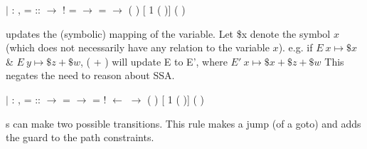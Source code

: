 \documentclass[12pt]{report}
\begin{document}
       
\begin{coqdoccode}
\coqdocindent{3.00em}
\ensuremath{|}  : \coqdockw{\ensuremath{\forall}}          ,\coqdoceol
\coqdocindent{5.00em}
 =   ::  \ensuremath{\rightarrow}\coqdoceol
\coqdocindent{5.00em}
 !  =   \ensuremath{\rightarrow}\coqdoceol
\coqdocindent{5.00em}
 =    \ensuremath{\rightarrow}\coqdoceol
\coqdocindent{5.00em}
 \coqdoceol
\coqdocindent{6.00em}
(        ) [ 1 ( )]\coqdoceol
\coqdocindent{6.00em}
(      )\coqdoceol
\coqdocnoindent
\coqdoceol
\coqdocindent{3.00em}
\end{coqdoccode}
 updates the (symbolic) mapping of the variable.
          Let \$x denote the symbol $x$ (which does not necessarily
          have any relation to the variable $x$).
          e.g. if $E\ x \mapsto \$x$ \& $E\ y \mapsto \$z + \$w$,
            ( + ) will update E to E', where
          $E'\ x \mapsto \$x + \$z + \$w$
          This negates the need to reason about SSA.


           
\begin{coqdoccode}
\coqdocindent{3.00em}
\ensuremath{|}  : \coqdockw{\ensuremath{\forall}}           ,\coqdoceol
\coqdocindent{5.00em}
 =    ::  \ensuremath{\rightarrow}\coqdoceol
\coqdocindent{5.00em}
   =   \ensuremath{\rightarrow}\coqdoceol
\coqdocindent{5.00em}
 =  !  \ensuremath{\leftarrow}  \ensuremath{\rightarrow}\coqdoceol
\coqdocindent{5.00em}
 \coqdoceol
\coqdocindent{6.00em}
(        ) [ 1 (  )]\coqdoceol
\coqdocindent{6.00em}
(      )\coqdoceol
\coqdocnoindent
\coqdoceol
\coqdocindent{3.00em}
\end{coqdoccode}
s can make two possible transitions.
          This rule makes a jump (of a goto) and adds the
          guard to the path constraints.
\end{document}

